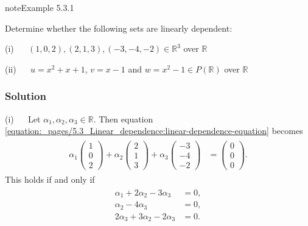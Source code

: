 \documentclass[letterpaper,10pt,english]{jupyterBook}
\begin{document}
\label{_pages/5.3_Linear_dependence:linear-dependence-equation}
\begin{sphinxadmonition}{note}{Example 5.3.1}



\sphinxAtStartPar
Determine whether the following sets are linearly dependent:

\sphinxAtStartPar
(i)   \((1, 0, 2), (2, 1, 3),(-3, -4, -2) \in \mathbb{R}^3\) over \(\mathbb{R}\)

\sphinxAtStartPar
(ii)   \(u = x^2 + x + 1\), \(v = x - 1\) and \(w = x^2 - 1 \in P(\mathbb{R})\) over \(\mathbb{R}\)
\subsubsection*{Solution}

\sphinxAtStartPar
(i)   Let \(\alpha_1, \alpha_2, \alpha_3 \in \mathbb{R}\). Then equation \eqref{equation:_pages/5.3_Linear_dependence:linear-dependence-equation} becomes
\begin{equation*}
\begin{split} \begin{align*}
    \alpha_1 \begin{pmatrix} 1 \\ 0 \\ 2 \end{pmatrix} +
    \alpha_2 \begin{pmatrix} 2 \\ 1 \\ 3 \end{pmatrix} +
    \alpha_3 \begin{pmatrix} -3 \\ -4 \\ -2 \end{pmatrix} &=
    \begin{pmatrix} 0 \\ 0 \\ 0 \end{pmatrix}.
\end{align*} \end{split}
\end{equation*}
\sphinxAtStartPar
This holds if and only if
\begin{equation*}
\begin{split} \begin{align*}
    \alpha_1 + 2\alpha_2 - 3\alpha_3 &= 0, \\
    \alpha_2 - 4\alpha_3 &= 0, \\
    2\alpha_3 + 3\alpha_2 - 2\alpha_3 &= 0.

\end{align*}
\end{split}
\end{equation*}
\end{sphinxadmonition}
\end{document}

